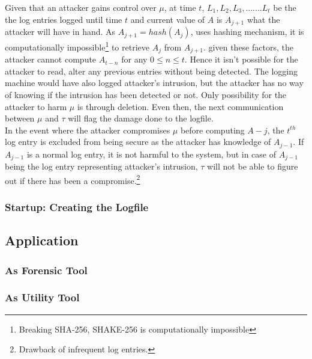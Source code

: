 \documentclass[12pt, letter]{article}
\begin{document}
Given that an attacker gains control over $\mu$, at time $t$, $L_1, L_2, L_3, ....... L_t$ be the the log entries logged until time $t$ and current value of $A$ is $A_{j+1}$ what the attacker will have in hand. As $A_{j+1} = hash(A_j)$, uses hashing mechanism, it is computationally impossible\footnote{Breaking SHA-256, SHAKE-256 is computationally impossible} to retrieve $A_j$ from $A_{j+1}$. given these factors, the attacker cannot compute $A_{t-n}$ for any $0 \leq n \leq t$. Hence it isn't possible for the attacker to read, alter any previous entries without being detected. The logging machine would have also logged attacker's intrusion, but the attacker has no way of knowing if the intrusion has been detected or not. Only possibility for the attacker to harm $\mu$ is through deletion. Even then, the next communication between $\mu$ and $\tau$ will flag the damage done to the logfile.\\


In the event where the attacker compromises $\mu$ before computing $A-j$, the $t^{th}$ log entry is excluded from being secure as the attacker has knowledge of $A_{j-1}$. If $A_{j-1}$ is a normal log entry, it is not harmful to the system, but in case of $A_{j-1}$ being the log entry representing attacker's intrusion, $\tau$ will not be able to figure out if there has been a compromise.\footnote{Drawback of infrequent log entries.}


\subsubsection{Startup: Creating the Logfile}




\subsection{Application}
\label{sec:application}

\blindtext

\subsubsection{As Forensic Tool}

\blindtext

\subsubsection{As Utility Tool}

\blindtext
\end{document}
